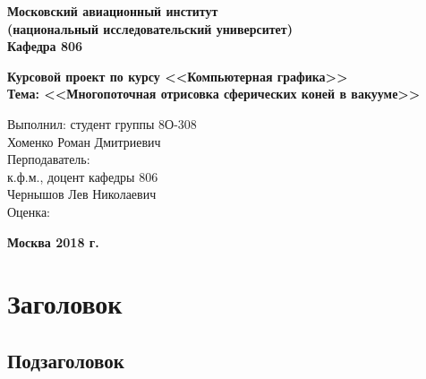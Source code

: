 \documentclass[a4paper]{article}
\newcommand{\fontFourteen} {
    \fontsize{14pt}{17pt}\normalfont
}
\begin{document}
\fontFourteen

\begin{titlepage}
\begin{spacing}{1}

\fontFourteen

\begin{center}
{\bfseries{
    {Московский авиационный институт} \\
    {(национальный исследовательский университет)} \\
    {Кафедра 806}
}}

\vspace{8cm}
{\bfseries{
    {Курсовой проект по курсу <<Компьютерная графика>> } \\
    {Тема: <<Многопоточная отрисовка сферических коней в вакууме>>}
}}
\end{center}

\vspace{5cm}
\begin{flushright}
\begin{minipage}{0.5\textwidth}
    \begin{flushleft}
        {Выполнил: студент группы 8О-308} \\
        {Хоменко Роман Дмитриевич} \\
        \vspace{0.5cm}
        {Перподаватель:} \\
        {к.ф.м., доцент кафедры 806} \\
        {Чернышов Лев Николаевич} \\
        \vspace{0.5cm}
        Оценка:
    \end{flushleft}
\end{minipage}
\end{flushright}

\vfill
\begin{center}
\bfseries{
    {Москва 2018 г.}
}
\end{center}

\end{spacing}
\end{titlepage}


\section{Заголовок}
\subsection{Подзаголовок}
\end{document}
